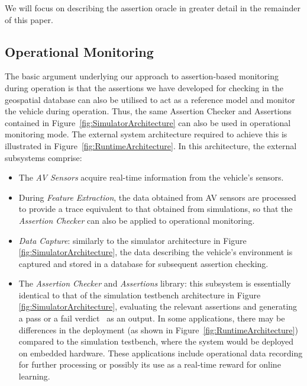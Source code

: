   We will focus on describing the assertion oracle in greater detail in the remainder of this paper.

\subsection{Operational Monitoring}
The basic argument underlying our approach to assertion-based monitoring during operation is that the assertions we have developed for checking in the geospatial database can also be utilised to act as a reference model and monitor the vehicle during operation.
%
Thus, the same Assertion Checker and Assertions contained in Figure~\ref{fig:SimulatorArchitecture} can also be used in operational monitoring mode. The external system architecture required to achieve this is illustrated in Figure~\ref{fig:RuntimeArchitecture}. In this architecture, the external subsystems comprise:
\begin{itemize}
    \item The \emph{AV Sensors} acquire real-time information from the vehicle's sensors.
    \item During \emph{Feature Extraction}, the data obtained from AV sensors are processed to provide a trace equivalent to that obtained from simulations, so that the \emph{Assertion Checker} can also be applied to operational monitoring.
    \item \emph{Data Capture}: similarly to the simulator architecture in Figure \ref{fig:SimulatorArchitecture}, the data describing the vehicle's environment is captured and stored in a database for subsequent assertion checking.
    \item The \emph{Assertion Checker} and \emph{Assertions} library: this subsystem is essentially identical to that of the simulation testbench architecture in Figure \ref{fig:SimulatorArchitecture}, evaluating the relevant assertions and generating a pass or a fail verdict~\cite{RuntimeReview} as an output. 
    In some applications, there may be differences in the deployment (as shown in Figure~\ref{fig:RuntimeArchitecture}) compared to the simulation testbench, where the system would be deployed on embedded hardware. These applications include operational data recording for further processing or possibly its use as a real-time reward for online learning.
 
\end{itemize}

